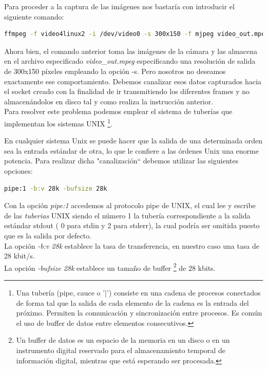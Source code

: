 Para proceder a la captura de las imágenes nos bastaría con introducir el siguiente comando:\\

\begin{lstlisting}[language=bash]
  ffmpeg -f video4linux2 -i /dev/video0 -s 300x150 -f mjpeg video_out.mpeg
\end{lstlisting}

Ahora bien, el comando anterior toma las imágenes de la cámara y las almacena en el archivo especificado \emph{ video\_out.mpeg} especificando una resolución de salida de 300x150 píxeles
empleando la opción -s. Pero nosotros no deseamos exactamente ese comportamiento. Debemos canalizar esos datos capturados hacia el socket creado con la finalidad de ir transmitiendo los 
diferentes frames y no almacenándolos en disco tal y como realiza la instrucción anterior.\\


Para resolver este problema podemos emplear el sistema de tuberías que implementan los sistemas UNIX \footnote{ Una tubería (pipe, cauce o '|') consiste en una cadena de 
procesos conectados de forma tal que la salida de cada elemento de la cadena es la entrada del próximo. Permiten la comunicación y sincronización entre procesos. Es común el uso de
buffer de datos entre elementos consecutivos. }.

En cualquier sistema Unix se puede hacer que la salida de una determinada orden sea la entrada estándar de otra, lo que le confiere a las órdenes Unix una enorme potencia.
Para realizar dicha "canalización`` debemos utilizar las siguientes opciones:\\

\begin{lstlisting}[language=bash]
  pipe:1 -b:v 28k -bufsize 28k
\end{lstlisting}


Con la opción \emph{pipe:1} accedemos al protocolo pipe de UNIX, el cual lee y escribe de las \emph{tuberias} UNIX siendo el número 1 la tubería correspondiente a la salida estándar 
stdout ( 0 para stdin y 2 para stderr), la cual podría ser omitida puesto que es la salida por defecto.\\

La opción \emph{-b:v 28k} establece la tasa de transferencia, en nuestro caso una tasa de 28 kbit/s.\\

La opción \emph{-bufsize 28k} establece un tamaño de buffer \footnote{Un buffer de datos es un espacio de la memoria en un disco o en un instrumento digital reservado para el almacenamiento
temporal de información digital, mientras que está esperando ser procesada.} de 28 kbits.\\

